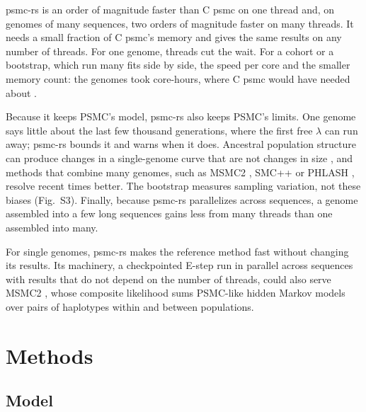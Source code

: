 \documentclass[11pt]{article}
\newcommand{\psmcrs}{psmc-rs}
\begin{document}
\psmcrs{} is an order of magnitude faster than C psmc on one thread and, on genomes of many sequences, two orders of magnitude faster on many threads. It needs a small fraction of C psmc's memory and gives the same results on any number of threads. For one genome, threads cut the wait. For a cohort or a bootstrap, which run many fits side by side, the speed per core and the smaller memory count: the \EsevenGenomes{} genomes took \EsevenRsCoreHours{} core-hours, where C psmc would have needed about \EsevenCCoreHoursAll{}.

Because it keeps PSMC's model, \psmcrs{} also keeps PSMC's limits. One genome says little about the last few thousand generations, where the first free $\lambda$ can run away; \psmcrs{} bounds it and warns when it does. Ancestral population structure can produce changes in a single-genome curve that are not changes in size \citep{mazet2016,cousins2025}, and methods that combine many genomes, such as MSMC2 \citep{schiffels2020}, SMC++ \citep{terhorst2017} or PHLASH \citep{terhorst2025}, resolve recent times better. The bootstrap measures sampling variation, not these biases (Fig.~S3). Finally, because \psmcrs{} parallelizes across sequences, a genome assembled into a few long sequences gains less from many threads than one assembled into many.

For single genomes, \psmcrs{} makes the reference method fast without changing its results. Its machinery, a checkpointed E-step run in parallel across sequences with results that do not depend on the number of threads, could also serve MSMC2 \citep{schiffels2020}, whose composite likelihood sums PSMC-like hidden Markov models over pairs of haplotypes within and between populations.

\FloatBarrier
\section*{Methods}

\subsection*{Model}
\end{document}
